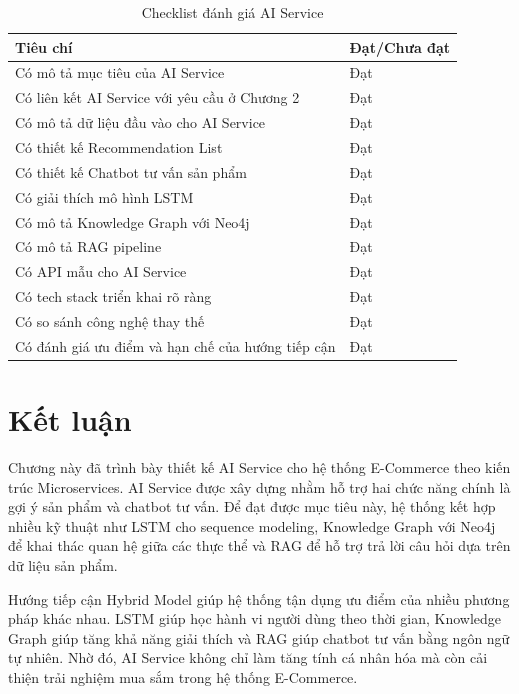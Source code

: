 \documentclass[../main.tex]{subfiles}
\begin{document}
\begin{table}[H]
    \centering
    \caption{Checklist đánh giá AI Service}
    \label{tab:chapter3-ai-checklist}
    \begin{tabular}{|p{}|p{}|}
        \hline
        \rowcolor{primary!35}
        \textbf{Tiêu chí} & \textbf{Đạt/Chưa đạt} \\
\hline
Có mô tả mục tiêu của AI Service & Đạt \\
\hline
Có liên kết AI Service với yêu cầu ở Chương 2 & Đạt \\
\hline
Có mô tả dữ liệu đầu vào cho AI Service & Đạt \\
\hline
Có thiết kế Recommendation List & Đạt \\
\hline
Có thiết kế Chatbot tư vấn sản phẩm & Đạt \\
\hline
Có giải thích mô hình LSTM & Đạt \\
\hline
Có mô tả Knowledge Graph với Neo4j & Đạt \\
\hline
Có mô tả RAG pipeline & Đạt \\
\hline
Có API mẫu cho AI Service & Đạt \\
\hline
Có tech stack triển khai rõ ràng & Đạt \\
\hline
Có so sánh công nghệ thay thế & Đạt \\
\hline
Có đánh giá ưu điểm và hạn chế của hướng tiếp cận & Đạt \\
\hline
\end{tabular}
\end{table}

\section{Kết luận}

Chương này đã trình bày thiết kế AI Service cho hệ thống E-Commerce theo kiến trúc Microservices. AI Service được xây dựng nhằm hỗ trợ hai chức năng chính là gợi ý sản phẩm và chatbot tư vấn. Để đạt được mục tiêu này, hệ thống kết hợp nhiều kỹ thuật như LSTM cho sequence modeling, Knowledge Graph với Neo4j để khai thác quan hệ giữa các thực thể và RAG để hỗ trợ trả lời câu hỏi dựa trên dữ liệu sản phẩm.

Hướng tiếp cận Hybrid Model giúp hệ thống tận dụng ưu điểm của nhiều phương pháp khác nhau. LSTM giúp học hành vi người dùng theo thời gian, Knowledge Graph giúp tăng khả năng giải thích và RAG giúp chatbot tư vấn bằng ngôn ngữ tự nhiên. Nhờ đó, AI Service không chỉ làm tăng tính cá nhân hóa mà còn cải thiện trải nghiệm mua sắm trong hệ thống E-Commerce.
\end{document}
